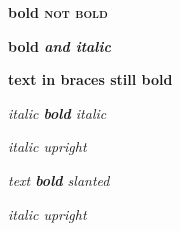 \documentclass[12pt]{article}
\newcommand\"{quote}
\begin{document}
\textbf{bold \textsc{not bold}}

\textbf{bold \emph{and italic}}

\textbf{text {in braces} still bold}

\textit{italic \textbf{bold} italic}

\textit{italic \textup{upright}}

\textsl{text \textbf{bold} slanted}

\textit{italic \textmd{upright}}
\end{document}
